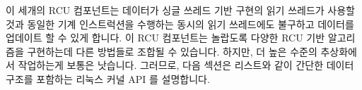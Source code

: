 이 세개의 RCU 컴포넌트는 데이터가 싱글 쓰레드 기반 구현의 읽기 쓰레드가 사용할
것과 동일한 기계 인스트럭션을 수행하는 동시의 읽기 쓰레드에도 불구하고 데이터를
업데이트 할 수 있게 합니다.
이 RCU 컴포넌트는 놀랍도록 다양한 RCU 기반 알고리즘을 구현하는데 다른 방법들로
조합될 수 있습니다.
하지만, 더 높은 수준의 추상화에서 작업하는게 보통은 낫습니다.
그러므로, 다음 섹션은 리스트와 같이 간단한 데이터 구조를 포함하는 리눅스 커널
API 를 설명합니다.


